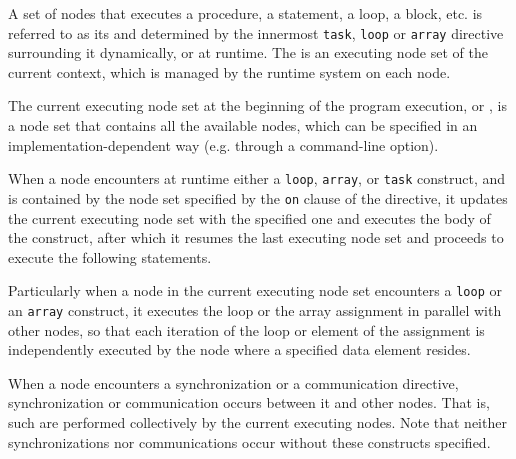 


A set of nodes that executes a procedure, a statement, a loop,
a block, etc. is referred to as its {\it {}} and
determined by the innermost {\tt task}, {\tt loop} or {\tt array}
directive surrounding it dynamically, or at runtime.
%
The {\it {}} is an executing node set of
the current context, which is managed by the {\XMP} runtime system on
each node.


The current executing node set at the beginning of the program
execution, or {\it {}}, is a node set that
contains all the available nodes, which can be specified in an 
implementation-dependent way (e.g. through a command-line option).
%

When a node encounters at runtime either a {\tt loop}, {\tt array}, or
{\tt task} construct, and is contained by the node set specified by the
{\tt on} clause of the directive, it updates the current executing node
set with the specified one and executes the body of the construct, after
which it resumes the last executing node set and proceeds to execute the
following statements.

Particularly when a node in the current executing node set encounters a
{\tt loop} or an {\tt array} construct, it executes the loop or the array
assignment in parallel with other nodes, so that each iteration of the
loop or element of the assignment is independently executed by the node
where a specified data element resides.

When a node encounters a synchronization or a communication directive,
synchronization or communication occurs between it and other nodes.
%
That is, such {\it {}} are performed collectively
by the current executing nodes.
%
Note that neither synchronizations nor communications occur without these
constructs specified.


